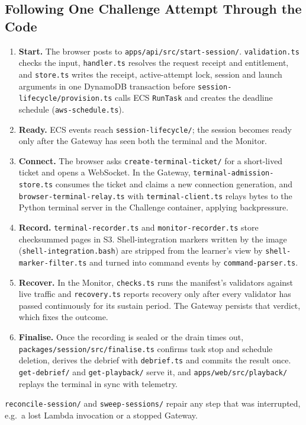 \documentclass[11pt,a4paper]{article}
\begin{document}
\subsection{Following One Challenge Attempt Through the Code}
\begin{enumerate}[leftmargin=*,label=\arabic*.]
  \item \textbf{Start.} The browser posts to \nolinkurl{apps/api/src/start-session/}.
  \nolinkurl{validation.ts} checks the input, \nolinkurl{handler.ts} resolves the request
  receipt and entitlement, and \nolinkurl{store.ts} writes the receipt, active-attempt
  lock, session and launch arguments in one DynamoDB transaction before
  \nolinkurl{session-lifecycle/provision.ts} calls ECS \nolinkurl{RunTask} and creates
  the deadline schedule (\nolinkurl{aws-schedule.ts}).
  \item \textbf{Ready.} ECS events reach \nolinkurl{session-lifecycle/}; the session
  becomes ready only after the Gateway has seen both the terminal and the Monitor.
  \item \textbf{Connect.} The browser asks \nolinkurl{create-terminal-ticket/} for a
  short-lived ticket and opens a WebSocket. In the Gateway,
  \nolinkurl{terminal-admission-store.ts} consumes the ticket and claims a new
  connection generation, and \nolinkurl{browser-terminal-relay.ts} with
  \nolinkurl{terminal-client.ts} relays bytes to the Python terminal server in the
  Challenge container, applying backpressure.
  \item \textbf{Record.} \nolinkurl{terminal-recorder.ts} and \nolinkurl{monitor-recorder.ts}
  store checksummed pages in S3. Shell-integration markers written by the image
  (\nolinkurl{shell-integration.bash}) are stripped from the learner's view by
  \nolinkurl{shell-marker-filter.ts} and turned into command events by
  \nolinkurl{command-parser.ts}.
  \item \textbf{Recover.} In the Monitor, \nolinkurl{checks.ts} runs the manifest's
  validators against live traffic and \nolinkurl{recovery.ts} reports recovery only
  after every validator has passed continuously for its sustain period. The Gateway
  persists that verdict, which fixes the outcome.
  \item \textbf{Finalise.} Once the recording is sealed or the drain times out,
  \nolinkurl{packages/session/src/finalise.ts} confirms task stop and schedule
  deletion, derives the debrief with \nolinkurl{debrief.ts} and commits the result once.
  \nolinkurl{get-debrief/} and \nolinkurl{get-playback/} serve it, and
  \nolinkurl{apps/web/src/playback/} replays the terminal in sync with telemetry.
\end{enumerate}
\nolinkurl{reconcile-session/} and \nolinkurl{sweep-sessions/} repair any step that was
interrupted, e.g.\ a lost Lambda invocation or a stopped Gateway.
\end{document}

